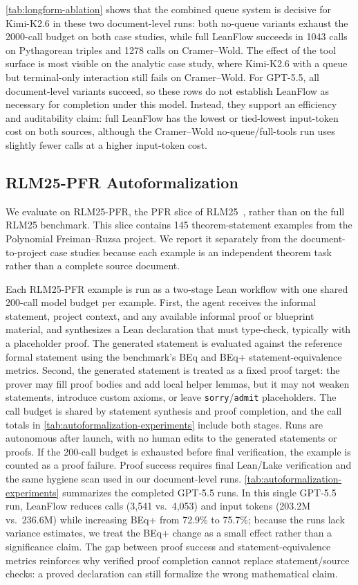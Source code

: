 \documentclass{article}
\newcommand{\method}{LeanFlow\xspace}
\newcommand{\kimi}{Kimi-K2.6\xspace}
\newcommand{\gpt}{GPT-5.5\xspace}
\newcommand{\lean}{Lean\xspace}
\begin{document}
\cref{tab:longform-ablation} shows that the combined queue system is decisive for \kimi in these two document-level runs: both no-queue variants exhaust the 2000-call budget on both case studies, while full \method succeeds in 1043 calls on Pythagorean triples and 1278 calls on Cramer--Wold.
The effect of the tool surface is most visible on the analytic case study, where \kimi with a queue but terminal-only interaction still fails on Cramer--Wold.
For \gpt, all document-level variants succeed, so these rows do not establish \method as necessary for completion under this model. Instead, they support an efficiency and auditability claim: full \method has the lowest or tied-lowest input-token cost on both sources, although the Cramer--Wold no-queue/full-tools run uses slightly fewer calls at a higher input-token cost.

\subsection{RLM25-PFR Autoformalization}

We evaluate on RLM25-PFR, the PFR slice of RLM25~\citep{poiroux2025rlmeval,poiroux2024reliable}, rather than on the full RLM25 benchmark.
This slice contains 145 theorem-statement examples from the Polynomial Freiman--Ruzsa project.
We report it separately from the document-to-project case studies because each example is an independent theorem task rather than a complete source document.

Each RLM25-PFR example is run as a two-stage \lean workflow with one shared 200-call model budget per example.
First, the agent receives the informal statement, project context, and any available informal proof or blueprint material, and synthesizes a \lean declaration that must type-check, typically with a placeholder proof.
The generated statement is evaluated against the reference formal statement using the benchmark's BEq and BEq+ statement-equivalence metrics.
Second, the generated statement is treated as a fixed proof target: the prover may fill proof bodies and add local helper lemmas, but it may not weaken statements, introduce custom axioms, or leave \texttt{sorry}/\texttt{admit} placeholders.
The call budget is shared by statement synthesis and proof completion, and the call totals in \cref{tab:autoformalization-experiments} include both stages.
Runs are autonomous after launch, with no human edits to the generated statements or proofs.
If the 200-call budget is exhausted before final verification, the example is counted as a proof failure.
Proof success requires final \lean/Lake verification and the same hygiene scan used in our document-level runs.
\cref{tab:autoformalization-experiments} summarizes the completed \gpt runs. In this single \gpt run, \method reduces calls (3{,}541 vs.\ 4{,}053) and input tokens (203.2M vs.\ 236.6M) while increasing BEq+ from 72.9\% to 75.7\%; because the runs lack variance estimates, we treat the BEq+ change as a small effect rather than a significance claim. The gap between proof success and statement-equivalence metrics reinforces why verified proof completion cannot replace statement/source checks: a proved declaration can still formalize the wrong mathematical claim.
\end{document}
